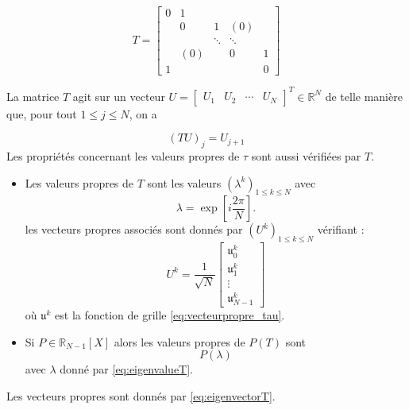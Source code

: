 \begin{equation}
T = \begin{bmatrix}
0 & 1 &   &   &   \\ 
  & 0 & 1 & (0) &   \\ 
  &   & \ddots & \ddots &   \\ 
  & (0) &   & 0 & 1 \\ 
1 &   &   &   & 0
\end{bmatrix} 
\end{equation}

La matrice $T$ agit sur un vecteur $U = \begin{bmatrix}
U_1 & U_2 & \cdots & U_{N} 
\end{bmatrix}^T \in \mathbb{R}^N $ de telle manière que, pour tout $1 \leq j \leq N$, on a 

\begin{equation}
(TU)_j = U_{j+1}
\end{equation}
Les propriétés concernant les valeurs propres de $\tau$ sont aussi vérifiées par $T$.

\begin{proposition}
\begin{itemize}
\item Les valeurs propres de $T$ sont les valeurs $(\lambda^k)_{1 \leq k \leq N}$ avec 
\begin{equation}
\lambda = \exp \left[ i \dfrac{2 \pi}{N} \right].
\label{eq:eigenvalueT}
\end{equation}
les vecteurs propres associés sont donnés par $\left( U^k \right)_{1 \leq k \leq N}$ vérifiant :
\begin{equation}
U^k = \dfrac{1}{\sqrt{N}} \begin{bmatrix}
\mathfrak{u}_0^k\\
\mathfrak{u}_1^k\\
\vdots \\
\mathfrak{u}_{N-1}^k
\end{bmatrix}
\label{eq:eigenvectorT}
\end{equation}
où $\mathfrak{u}^k$ est la fonction de grille \eqref{eq:vecteurpropre_tau}.

\item Si $P \in \mathbb{R}_{N-1}[X]$ alors les valeurs propres de $P(T)$ sont 
\begin{equation}
P(\lambda)
\end{equation}
avec $\lambda$ donné par \eqref{eq:eigenvalueT}.
\end{itemize}
Les vecteurs propres sont donnés par \eqref{eq:eigenvectorT}.
\label{prop:eigen_P(tau)}
\end{proposition}


